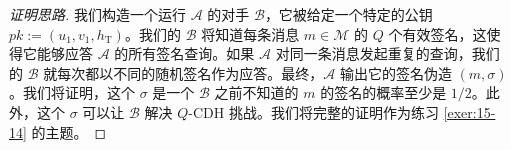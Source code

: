 \begin{proof}[证明思路]
我们构造一个运行 $\mathcal{A}$ 的对手 $\mathcal{B}$，它被给定一个特定的公钥 $pk:=(u_1,v_1,h_\mathrm{T})$。我们的 $\mathcal{B}$ 将知道每条消息 $m\in\mathcal{M}$ 的 $Q$ 个有效签名，这使得它能够应答 $\mathcal{A}$ 的所有签名查询。如果 $\mathcal{A}$ 对同一条消息发起重复的查询，我们的 $\mathcal{B}$ 就每次都以不同的随机签名作为应答。最终，$\mathcal{A}$ 输出它的签名伪造 $(m,\sigma)$。我们将证明，这个 $\sigma$ 是一个 $\mathcal{B}$ 之前不知道的 $m$ 的签名的概率至少是 $1/2$。此外，这个 $\sigma$ 可以让 $\mathcal{B}$ 解决 $Q$-CDH 挑战。我们将完整的证明作为练习 \ref{exer:15-14} 的主题。
\end{proof}